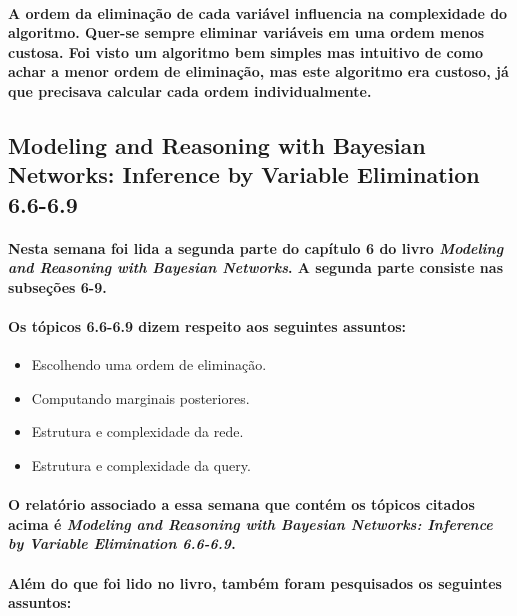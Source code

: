 \documentclass[a4paper,10pt]{article}
\theoremstyle{plain}
\begin{document}
\paragraph{
  A ordem da eliminação de cada variável influencia na complexidade do algoritmo. Quer-se sempre
  eliminar variáveis em uma ordem menos custosa. Foi visto um algoritmo bem simples mas intuitivo
  de como achar a menor ordem de eliminação, mas este algoritmo era custoso, já que precisava
  calcular cada ordem individualmente.
}

\subsection{Modeling and Reasoning with Bayesian Networks: Inference by Variable Elimination 6.6-6.9}

\paragraph{
  Nesta semana foi lida a segunda parte do capítulo 6 do livro \textit{Modeling and Reasoning with
  Bayesian Networks}\cite{bayes-net-darwiche}. A segunda parte consiste nas subseções 6-9.
}

\paragraph{
  Os tópicos 6.6-6.9 dizem respeito aos seguintes assuntos:
}

\begin{itemize}
  \item Escolhendo uma ordem de eliminação.
  \item Computando marginais posteriores.
  \item Estrutura e complexidade da rede.
  \item Estrutura e complexidade da query.
\end{itemize}

\paragraph{
  O relatório associado a essa semana que contém os tópicos citados acima é \textit{Modeling and
  Reasoning with Bayesian Networks: Inference by Variable Elimination 6.6-6.9}\cite{report-5}.
}

\paragraph{
  Além do que foi lido no livro, também foram pesquisados os seguintes assuntos:
}
\end{document}
